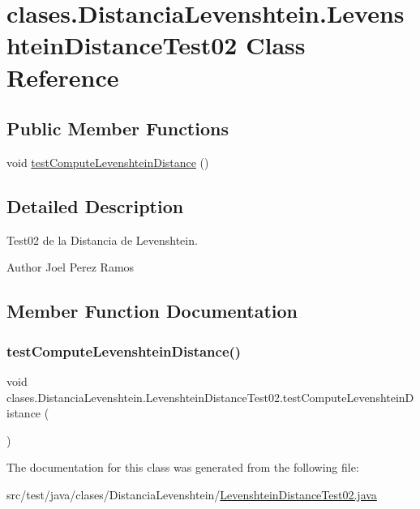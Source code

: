 \hypertarget{classclases_1_1_distancia_levenshtein_1_1_levenshtein_distance_test02}{}\section{clases.\+Distancia\+Levenshtein.\+Levenshtein\+Distance\+Test02 Class Reference}
\label{classclases_1_1_distancia_levenshtein_1_1_levenshtein_distance_test02}
\subsection*{Public Member Functions}
\begin{DoxyCompactItemize}
\item 
void \hyperlink{classclases_1_1_distancia_levenshtein_1_1_levenshtein_distance_test02_a0fb8d5113fa9cf3ce9f2378b06b3fdd7}{test\+Compute\+Levenshtein\+Distance} ()
\end{DoxyCompactItemize}


\subsection{Detailed Description}
Test02 de la Distancia de Levenshtein. \begin{DoxyAuthor}{Author}
Joel Perez Ramos 
\end{DoxyAuthor}


\subsection{Member Function Documentation}
\hypertarget{classclases_1_1_distancia_levenshtein_1_1_levenshtein_distance_test02_a0fb8d5113fa9cf3ce9f2378b06b3fdd7}{}\label{classclases_1_1_distancia_levenshtein_1_1_levenshtein_distance_test02_a0fb8d5113fa9cf3ce9f2378b06b3fdd7} 
\subsubsection{\texorpdfstring{test\+Compute\+Levenshtein\+Distance()}{testComputeLevenshteinDistance()}}
{\footnotesize\ttfamily void clases.\+Distancia\+Levenshtein.\+Levenshtein\+Distance\+Test02.\+test\+Compute\+Levenshtein\+Distance (\begin{DoxyParamCaption}{ }\end{DoxyParamCaption})}



The documentation for this class was generated from the following file\+:\begin{DoxyCompactItemize}
\item 
src/test/java/clases/\+Distancia\+Levenshtein/\hyperlink{_levenshtein_distance_test02_8java}{Levenshtein\+Distance\+Test02.\+java}\end{DoxyCompactItemize}
